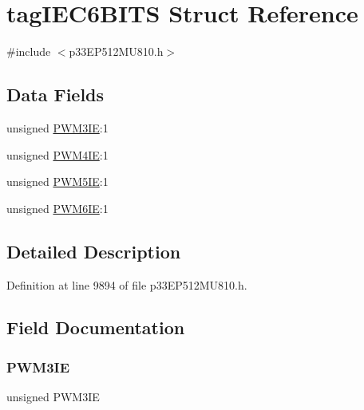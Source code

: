 \hypertarget{structtag_i_e_c6_b_i_t_s}{}\section{tag\+I\+E\+C6\+B\+I\+TS Struct Reference}
\label{structtag_i_e_c6_b_i_t_s}


{\ttfamily \#include $<$p33\+E\+P512\+M\+U810.\+h$>$}

\subsection*{Data Fields}
\begin{DoxyCompactItemize}
\item 
unsigned \hyperlink{structtag_i_e_c6_b_i_t_s_a3977f9934ecffc828dadeb1639502445}{P\+W\+M3\+IE}\+:1
\item 
unsigned \hyperlink{structtag_i_e_c6_b_i_t_s_aefa6ab25aa514189774d5fbe0be2e21e}{P\+W\+M4\+IE}\+:1
\item 
unsigned \hyperlink{structtag_i_e_c6_b_i_t_s_a21048c2f97ebf6173864fbf4a07c7419}{P\+W\+M5\+IE}\+:1
\item 
unsigned \hyperlink{structtag_i_e_c6_b_i_t_s_a68eb3f044332ba68161c3732e156618b}{P\+W\+M6\+IE}\+:1
\end{DoxyCompactItemize}


\subsection{Detailed Description}


Definition at line 9894 of file p33\+E\+P512\+M\+U810.\+h.



\subsection{Field Documentation}
\mbox{\label{structtag_i_e_c6_b_i_t_s_a3977f9934ecffc828dadeb1639502445}} 
\subsubsection{\texorpdfstring{P\+W\+M3\+IE}{PWM3IE}}
{\footnotesize\ttfamily unsigned P\+W\+M3\+IE}



